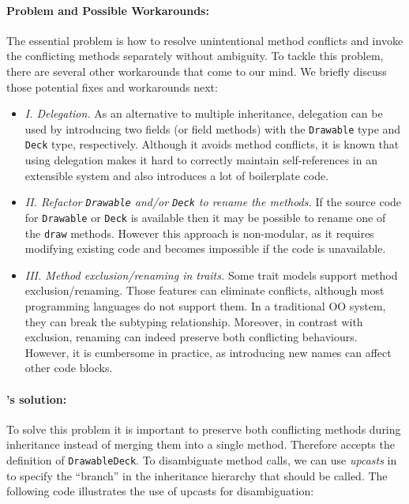 \paragraph{Problem and Possible Workarounds:} The essential problem is
how to resolve unintentional method conflicts and invoke the
conflicting methods separately without ambiguity. To tackle this problem, there are several other workarounds
that come to our mind. We briefly discuss those potential fixes and
workarounds next:
\begin{itemize}
  \item \textit{I. Delegation.} As an alternative to multiple inheritance,
  delegation can be used by introducing two fields (or field methods) with the 
  \lstinline|Drawable| type and \lstinline|Deck| type,
  respectively. Although it avoids method conflicts, it is known
  that using delegation makes it hard to correctly maintain
  self-references in an extensible system and also
  introduces a lot of boilerplate code.
  \item \textit{II. Refactor \lstinline|Drawable| and/or \lstinline|Deck| to rename the methods.} If
  the source code for \lstinline|Drawable| or \lstinline|Deck| is available
  then it may be possible to rename one of the \lstinline|draw|
  methods. However this approach is non-modular, as it requires 
  modifying existing code and becomes impossible if the code is unavailable.
  \item \textit{III. Method exclusion/renaming in traits.} Some trait models
  support method exclusion/renaming. Those features
   can eliminate conflicts, although most
  programming languages do not support them. In a traditional OO system,
  they can break the subtyping relationship. Moreover, in
  contrast with exclusion, renaming can indeed preserve both conflicting
  behaviours. However, it is cumbersome in practice, as introducing new
  names can affect other code blocks.
\end{itemize}


\paragraph{\MIM{}'s solution:} To solve this problem it is important to preserve both conflicting methods
during inheritance instead of merging them into a single
method. Therefore \MIM{} accepts the definition of
\lstinline|DrawableDeck|. To disambiguate method calls, 
we can use \emph{upcasts} in \MIM{} to specify the ``branch'' in the
inheritance hierarchy that should be called. The following code
illustrates the use of upcasts for disambiguation:

